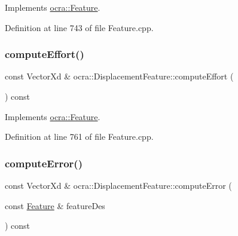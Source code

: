 Implements \hyperlink{classocra_1_1Feature_a19626a241666fdae253af1f7b6f2acd7}{ocra\+::\+Feature}.



Definition at line 743 of file Feature.\+cpp.

\hypertarget{classocra_1_1DisplacementFeature_aee1c2f5af98c28e8d6ab3dbeb5c3c297}{}\label{classocra_1_1DisplacementFeature_aee1c2f5af98c28e8d6ab3dbeb5c3c297} 
\subsubsection{\texorpdfstring{compute\+Effort()}{computeEffort()}\hspace{0.1cm}{\footnotesize\ttfamily [2/2]}}
{\footnotesize\ttfamily const Vector\+Xd \& ocra\+::\+Displacement\+Feature\+::compute\+Effort (\begin{DoxyParamCaption}{ }\end{DoxyParamCaption}) const\hspace{0.3cm}{\ttfamily [virtual]}}



Implements \hyperlink{classocra_1_1Feature_ae43f2ffc54862d6ddc0b02fd39431eb6}{ocra\+::\+Feature}.



Definition at line 761 of file Feature.\+cpp.

\hypertarget{classocra_1_1DisplacementFeature_a61d1caacf56e60bb3f33d2c91d5b89f2}{}\label{classocra_1_1DisplacementFeature_a61d1caacf56e60bb3f33d2c91d5b89f2} 
\subsubsection{\texorpdfstring{compute\+Error()}{computeError()}\hspace{0.1cm}{\footnotesize\ttfamily [1/2]}}
{\footnotesize\ttfamily const Vector\+Xd \& ocra\+::\+Displacement\+Feature\+::compute\+Error (\begin{DoxyParamCaption}\item[{const \hyperlink{classocra_1_1Feature}{Feature} \&}]{feature\+Des }\end{DoxyParamCaption}) const\hspace{0.3cm}{\ttfamily [virtual]}}



